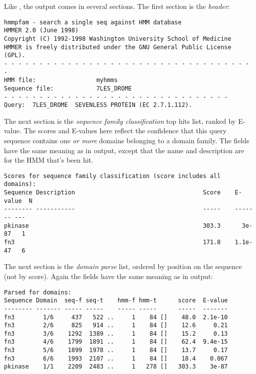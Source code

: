 Like , the  output comes in several
sections. The first section is the {\em header}:

{\small\begin{verbatim}
hmmpfam - search a single seq against HMM database
HMMER 2.0 (June 1998)
Copyright (C) 1992-1998 Washington University School of Medicine
HMMER is freely distributed under the GNU General Public License (GPL).
- - - - - - - - - - - - - - - - - - - - - - - - - - - - - - - - - - - -
HMM file:                 myhmms
Sequence file:            7LES_DROME
- - - - - - - - - - - - - - - - - - - - - - - - - - - - - - - -
Query:  7LES_DROME  SEVENLESS PROTEIN (EC 2.7.1.112).
\end{verbatim}}

The next section is the {\em sequence family classification} top hits
list, ranked by E-value. The scores and E-values here reflect the
confidence that this query sequence contains one {\em or more} domains
belonging to a domain family. The fields have the same meaning as in
 output, except that the name and description are for
the HMM that's been hit.

{\small\begin{verbatim}
Scores for sequence family classification (score includes all domains):
Sequence Description                                    Score    E-value  N 
-------- -----------                                    -----    ------- ---
pkinase                                                 303.3      3e-87   1
fn3                                                     171.8    1.1e-47   6
\end{verbatim}}

The next section is the {\em domain parse} list, ordered by position
on the sequence (not by score). Again the fields have the same meaning
as in  output:

{\small\begin{verbatim}
Parsed for domains:
Sequence Domain  seq-f seq-t    hmm-f hmm-t      score  E-value
-------- ------- ----- -----    ----- -----      -----  -------
fn3        1/6     437   522 ..     1    84 []    48.0  2.1e-10
fn3        2/6     825   914 ..     1    84 []    12.6     0.21
fn3        3/6    1292  1389 ..     1    84 []    15.2     0.13
fn3        4/6    1799  1891 ..     1    84 []    62.4  9.4e-15
fn3        5/6    1899  1978 ..     1    84 []    13.7     0.17
fn3        6/6    1993  2107 ..     1    84 []    18.4    0.067
pkinase    1/1    2209  2483 ..     1   278 []   303.3    3e-87
\end{verbatim}}

